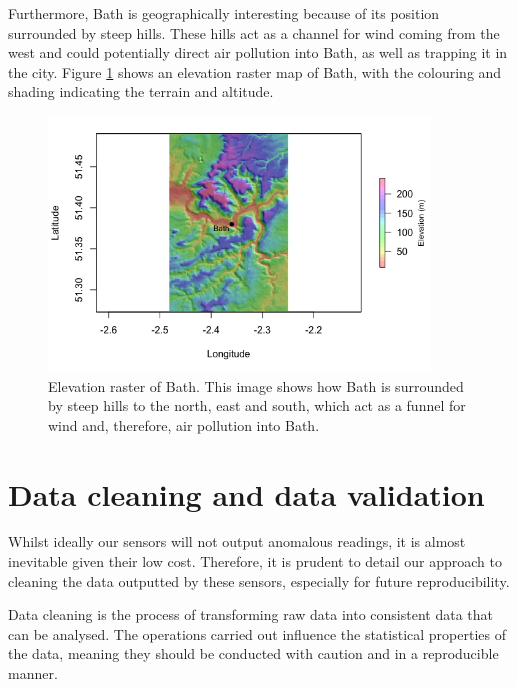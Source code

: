 \documentclass[11pt]{report}
\begin{document}

Furthermore, Bath is geographically interesting because of its position surrounded by steep hills. These hills act as a channel for wind coming from the west and could potentially direct air pollution into Bath, as well as trapping it in the city. Figure \ref{bath_elevation} shows an elevation raster map of Bath, with the colouring and shading indicating the terrain and altitude.

\begin{figure}[!htb]
\centering
\includegraphics[width=0.9\textwidth]{images/bath_elevation_large}
\caption[Elevation raster of Bath.]{Elevation raster of Bath. This image shows how Bath is surrounded by steep hills to the north, east and south, which act as a funnel for wind and, therefore, air pollution into Bath.}
\label{bath_elevation}
\end{figure}

\section{Data cleaning and data validation}

Whilst ideally our sensors will not output anomalous readings, it is almost inevitable given their low cost. Therefore, it is prudent to detail our approach to cleaning the data outputted by these sensors, especially for future reproducibility.

Data cleaning is the process of transforming raw data into consistent data that can be analysed. The operations carried out influence the statistical properties of the data, meaning they should be conducted with caution and in a reproducible manner.

\end{document}
